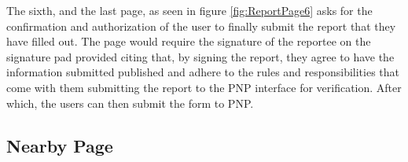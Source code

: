 The sixth, and the last page, as seen in figure \ref{fig:ReportPage6} asks for the confirmation and authorization of the user to finally submit the report that they have filled out. The page would require the signature of the reportee on the signature pad provided citing that, by signing the report, they agree to have the information submitted published and adhere to the rules and responsibilities that come with them submitting the report to the PNP interface for verification. After which, the users can then submit the form to PNP.

\subsection{Nearby Page}

\begin{figure}[!h]
    \centering
    \begin{subfigure}[c]{0.40\linewidth}
        \centering

\end{subfigure}
\end{figure}
